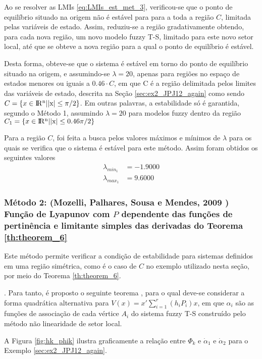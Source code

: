 Ao se resolver as LMIs \ref{eq:LMIs_est_met_3}, verificou-se que o ponto de equilíbrio situado na origem não é estável para para a toda a região $C$, limitada pelas variáveis de estado. Assim, reduziu-se a região gradativamente obtendo, para cada nova região, um novo modelo fuzzy T-S, limitado para este novo setor local, até que se obteve a nova região para a qual o ponto de equilíbrio é estável.

Desta forma, obteve-se que o sistema é estável em torno do ponto de equilíbrio situado na origem, e assumindo-se $\lambda = 20$, apenas para regiões no espaço de estados menores ou iguais a $0.46\cdot C$, em que C é a região delimitada pelos limites das variáveis de estado, descrita na Seção \ref{sec:ex2_JPJ12_again} como sendo $C = \{x \in \rm I\!R^n | |x| \leq \pi/2\}$. Em outras palavras, a estabilidade só é garantida, segundo o Método 1, assumindo $\lambda = 20$ para modelos fuzzy dentro da região $C_1 = \{x \in \rm I\!R^n | |x| \leq 0.46\pi/2\}$

Para a região $C$, foi feita a busca pelos valores máximos e mínimos de $\lambda$ para os quais se verifica que o sistema é estável para este método. Assim foram obtidos os seguintes valores
\begin{align*}\lambda_{min_1} &= -1.9000\\\lambda_{max_1} &=9.6000\end{align*}

\subsubsection{Método 2: (Mozelli, Palhares, Sousa e Mendes, 2009 \cite{MPSM:2009}) Função de  Lyapunov com $P$ dependente das funções de pertinência e limitante simples das derivadas do Teorema \ref{th:theorem_6}}

Este método permite verificar a condição de estabilidade para sistemas definidos em uma região simétrica, como é o caso de $C$ no exemplo utilizado nesta seção, por meio do Teorema \ref{th:theorem_6}.

. Para tanto, é proposto o seguinte teorema \cite{MPSM:2009}, para o qual deve-se considerar a forma quadrática alternativa para $V(x) = x'\sum_{i = 1}^{r}(h_iP_i)x$, em que $\alpha_i$ são as funções de associação de cada vértice $A_i$ do sistema fuzzy T-S construído pelo método não linearidade de setor local.

A Figura \ref{fig:hk_phik} ilustra graficamente a relação entre $\Phi_k$ e $\dot{\alpha}_1$ e $\dot{\alpha}_2$ para o Exemplo \ref{sec:ex2_JPJ12_again}.

